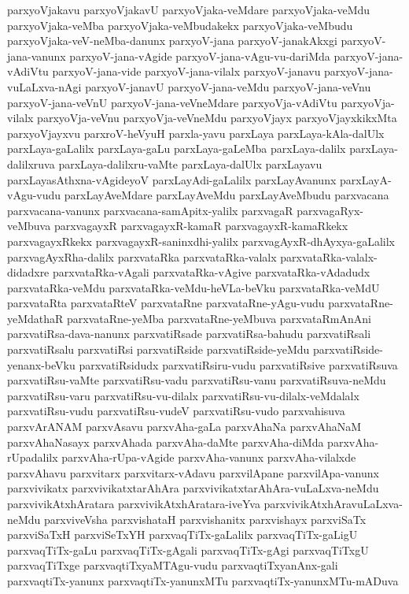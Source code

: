 {parxyoVjakavu
parxyoVjakavU
parxyoVjaka-veMdare
parxyoVjaka-veMdu
parxyoVjaka-veMba
parxyoVjaka-veMbudakekx
parxyoVjaka-veMbudu
parxyoVjaka-veV-neMba-danunx
parxyoV-jana
parxyoV-janakAkxgi
parxyoV-jana-vanunx
parxyoV-jana-vAgide
parxyoV-jana-vAgu-vu-dariMda
parxyoV-jana-vAdiVtu
parxyoV-jana-vide
parxyoV-jana-vilalx
parxyoV-janavu
parxyoV-jana-vuLaLxva-nAgi
parxyoV-janavU
parxyoV-jana-veMdu
parxyoV-jana-veVnu
parxyoV-jana-veVnU
parxyoV-jana-veVneMdare
parxyoVja-vAdiVtu
parxyoVja-vilalx
parxyoVja-veVnu
parxyoVja-veVneMdu
parxyoVjayx
parxyoVjayxkikxMta
parxyoVjayxvu
parxroV-heVyuH
parxla-yavu
parxLaya
parxLaya-kAla-dalUlx
parxLaya-gaLalilx
parxLaya-gaLu
parxLaya-gaLeMba
parxLaya-dalilx
parxLaya-dalilxruva
parxLaya-dalilxru-vaMte
parxLaya-dalUlx
parxLayavu
parxLayasAthxna-vAgideyoV
parxLayAdi-gaLalilx
parxLayAvanunx
parxLayA-vAgu-vudu
parxLayAveMdare
parxLayAveMdu
parxLayAveMbudu
parxvacana
parxvacana-vanunx
parxvacana-samApitx-yalilx
parxvagaR
parxvagaRyx-veMbuva
parxvagayxR
parxvagayxR-kamaR
parxvagayxR-kamaRkekx
parxvagayxRkekx
parxvagayxR-saninxdhi-yalilx
parxvagAyxR-dhAyxya-gaLalilx
parxvagAyxRha-dalilx
parxvataRka
parxvataRka-valalx
parxvataRka-valalx-didadxre
parxvataRka-vAgali
parxvataRka-vAgive
parxvataRka-vAdadudx
parxvataRka-veMdu
parxvataRka-veMdu-heVLa-beVku
parxvataRka-veMdU
parxvataRta
parxvataRteV
parxvataRne
parxvataRne-yAgu-vudu
parxvataRne-yeMdathaR
parxvataRne-yeMba
parxvataRne-yeMbuva
parxvataRmAnAni
parxvatiRsa-dava-nanunx
parxvatiRsade
parxvatiRsa-bahudu
parxvatiRsali
parxvatiRsalu
parxvatiRsi
parxvatiRside
parxvatiRside-yeMdu
parxvatiRside-yenanx-beVku
parxvatiRsidudx
parxvatiRsiru-vudu
parxvatiRsive
parxvatiRsuva
parxvatiRsu-vaMte
parxvatiRsu-vadu
parxvatiRsu-vanu
parxvatiRsuva-neMdu
parxvatiRsu-varu
parxvatiRsu-vu-dilalx
parxvatiRsu-vu-dilalx-veMdalalx
parxvatiRsu-vudu
parxvatiRsu-vudeV
parxvatiRsu-vudo
parxvahisuva
parxvArANAM
parxvAsavu
parxvAha-gaLa
parxvAhaNa
parxvAhaNaM
parxvAhaNasayx
parxvAhada
parxvAha-daMte
parxvAha-diMda
parxvAha-rUpadalilx
parxvAha-rUpa-vAgide
parxvAha-vanunx
parxvAha-vilalxde
parxvAhavu
parxvitarx
parxvitarx-vAdavu
parxvilApane
parxvilApa-vanunx
parxvivikatx
parxvivikatxtarAhAra
parxvivikatxtarAhAra-vuLaLxva-neMdu
parxvivikAtxhAratara
parxvivikAtxhAratara-iveYva
parxvivikAtxhAravuLaLxva-neMdu
parxviveVsha
parxvishataH
parxvishanitx
parxvishayx
parxviSaTx
parxviSaTxH
parxviSeTxYH
parxvaqTiTx-gaLalilx
parxvaqTiTx-gaLigU
parxvaqTiTx-gaLu
parxvaqTiTx-gAgali
parxvaqTiTx-gAgi
parxvaqTiTxgU
parxvaqTiTxge
parxvaqtiTxyaMTAgu-vudu
parxvaqtiTxyanAnx-gali
parxvaqtiTx-yanunx
parxvaqtiTx-yanunxMTu
parxvaqtiTx-yanunxMTu-mADuva
}
